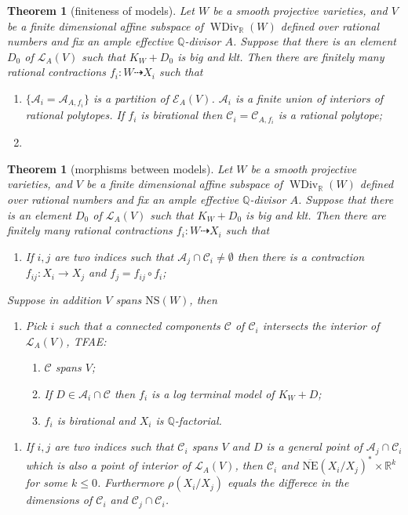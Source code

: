 \documentclass{article}
\newtheorem{thm}[defn]{Theorem}
\begin{document}
\begin{thm}[finiteness of models]\label{finiteamplemodel}
  Let $W$ be a smooth projective   varieties, and  $ V $ be a finite dimensional affine subspace of $ \operatorname{WDiv}_{\mathbb{R}}(W) $ defined over rational numbers and fix an ample effective $\mathbb{Q}$-divisor $A$. Suppose that there is an element $D_{0}$ of $\mathcal{L}_{A}(V)$ such that $K_{W}+D_{0}$ is big and klt. Then there are finitely many rational contractions $ f_i:W\dashrightarrow X_i $ such that
  \begin{enumerate}
    \item $ \{\mathcal{A}_i=\mathcal{A}_{A,f_i}\} $ is a partition of $ \mathcal{E}_{A}(V) $. $ \mathcal{A}_i $ is a finite union of interiors of rational polytopes. If $ f_i $ is birational then $ \mathcal{C}_i=\mathcal{C}_{A,f_i} $ is a rational polytope;
      \item  
  \end{enumerate}
\end{thm}

\begin{thm}[morphisms between models]
  Let $W$ be a smooth projective   varieties, and  $ V $ be a finite dimensional affine subspace of $ \operatorname{WDiv}_{\mathbb{R}}(W) $ defined over rational numbers and fix an ample effective $\mathbb{Q}$-divisor $A$. Suppose that there is an element $D_{0}$ of $\mathcal{L}_{A}(V)$ such that $K_{W}+D_{0}$ is big and klt. Then there are finitely many rational contractions $ f_i:W\dashrightarrow X_i $ such that
  \begin{enumerate}
    \item If $ i,j $ are two indices such that $ \mathcal{A}_j\cap \mathcal{C}_i\neq \emptyset $ then there is a contraction $ f_{ij}:X_i\to X_j $ and $ f_j=f_{ij}\circ f_i $;
  \end{enumerate}
  Suppose in addition $ V $ spans $ \mathrm{NS}(W) $, then
  \begin{enumerate}[2]
    \item Pick $ i $ such that a connected components $ \mathcal{C} $ of $ \mathcal{C}_i $ intersects the interior of $ \mathcal{L}_A(V) $, TFAE:
    \begin{enumerate}[a]
      \item $ \mathcal{C} $ spans $ V $;
      \item If $ D\in \mathcal{A}_i\cap \mathcal{C} $ then $ f_i $ is a log terminal model of $ K_W+D $;
      \item $ f_i $ is birational and $ X_i $ is $ \mathbb{Q} $-factorial.
    \end{enumerate}
  \end{enumerate}
  \begin{enumerate}[3]
    \item If $ i,j $ are two indices such that $ \mathcal{C}_i $ spans $ V $ and $ D $ is a general point of $ \mathcal{A}_j\cap \mathcal{C}_i $ which is also a point of interior of $ \mathcal{L}_A(V) $, then $ \mathcal{C}_i $ and $ \overline{\mathrm{NE}}(X_i/X_j)^*\times \mathbb{R}^k $ for some $ k\leqslant 0 $. Furthermore $ \rho(X_i/X_j) $ equals the differece in the dimensions of $ \mathcal{C}_i $ and $ \mathcal{C}_j\cap \mathcal{C}_i $.
  \end{enumerate}
\end{thm}
\end{document}
